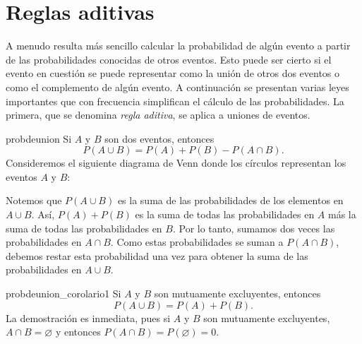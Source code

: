 \section{Reglas aditivas}

A menudo resulta más sencillo calcular la probabilidad de algún evento a partir de las
probabilidades conocidas de otros eventos. Esto puede ser cierto si el evento en cuestión se puede representar como la unión de otros dos eventos o como el complemento de algún evento. A continuación se presentan varias leyes importantes que con frecuencia simplifican el cálculo de las probabilidades. La primera, que se denomina \emph{regla aditiva}, se aplica a uniones de eventos.

\newpage

\begin{theorem}{}{probdeunion}
    Si $A$ y $B$ son dos eventos, entonces
    $$P(A \cup B) = P(A) + P(B) - P(A \cap B).$$
    \tcblower
    \demostracion Consideremos el siguiente diagrama de Venn donde los círculos representan los eventos $A$ y $B$:
    \begin{center}
        \captionsetup*[figure]{hypcap=false}%
    \end{center}
    Notemos que $P(A \cup B)$ es la suma de las probabilidades de los elementos en $A ∪ B$. Así, $P(A) + P(B)$ es la suma de todas las probabilidades en $A$ más la suma de todas las probabilidades en $B$. Por lo tanto, sumamos dos veces las probabilidades en $A \cap B$. Como estas probabilidades se suman a $P(A \cap B)$, debemos restar esta probabilidad una vez para obtener la suma de las probabilidades en $A \cup B$.
\end{theorem}

\begin{corollary}{}{probdeunion_corolario1}
    Si $A$ y $B$ son mutuamente excluyentes, entonces
    $$P(A \cup B) = P(A) + P(B).$$
    \tcblower
    \demostracion La demostración es inmediata, pues si $A$ y $B$ son mutuamente excluyentes, $A \cap B = \varnothing$ y entonces $P(A \cap B) = P(\varnothing) = 0$.
\end{corollary}


